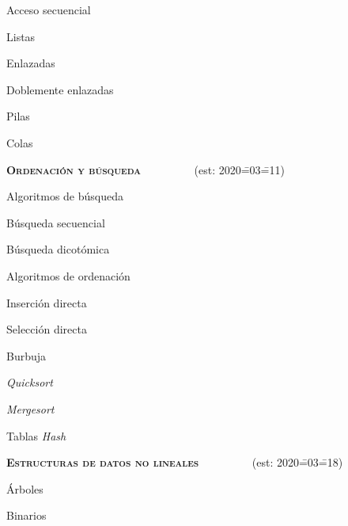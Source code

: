 \begin{longenum}
\begin{longenum}
\begin{longenum}
\begin{longenum}
            \end{longenum}
        \end{longenum}
        \item Acceso secuencial
        \begin{longenum}
            \item Listas
            \begin{longenum}
                \item Enlazadas
                \item Doblemente enlazadas
            \end{longenum}
            \item Pilas
            \item Colas
        \end{longenum}
    \end{longenum}
    \item \textbf{\textsc{Ordenación y búsqueda}} \ \ \ \ \ \ \ \ \ (est: 2020\==03\==11)
    \begin{longenum}
        \item Algoritmos de búsqueda
        \begin{longenum}
            \item Búsqueda secuencial
            \item Búsqueda dicotómica
        \end{longenum}
        \item Algoritmos de ordenación
        \begin{longenum}
            \item Inserción directa
            \item Selección directa
            \item Burbuja
            \item \textit{Quicksort}
            \item \textit{Mergesort}
        \end{longenum}
        \item Tablas \textit{Hash}
    \end{longenum}
    \item \textbf{\textsc{Estructuras de datos no lineales}} \ \ \ \ \ \ \ \ \ (est: 2020\==03\==18)
    \begin{longenum}
        \item Árboles
        \begin{longenum}
            \item Binarios

\end{longenum}
\end{longenum}
\end{longenum}
